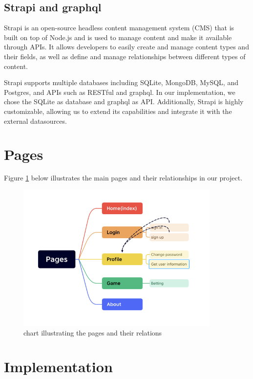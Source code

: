 \documentclass[singlecolumn]{article}
\begin{document}
\subsection{Strapi and graphql}
Strapi is an open-source headless content management system (CMS) that is built on top of Node.js and is used to manage content and make it available through APIs. It allows developers to easily create and manage content types and their fields, as well as define and manage relationships between different types of content.

Strapi supports multiple databases including SQLite, MongoDB, MySQL, and Postgres, and APIs such as RESTful and graphql. In our implementation, we chose the SQLite as database and graphql as API. Additionally, Strapi is highly customizable, allowing us to extend its capabilities and integrate it with the external datasources.


\section{Pages}
Figure \ref{fig:pages} below illustrates the main pages and their relationships in our project. 

\begin{figure}[H]
    \centering
    \includegraphics[width=0.9\textwidth]{pages.png}
    \caption{chart illustrating the pages and their relations}
    \label{fig:pages}
\end{figure}


\section{Implementation}
\end{document}
